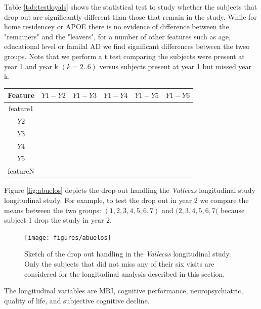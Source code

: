 \documentclass[11pt]{article}
\theoremstyle{definition}
\theoremstyle{remark}
\begin{document}
Table \ref{tab:testloyals} shows the statistical test to study whether the subjects that drop out are significantly different than those that remain in the study. While for home residencey or APOE there is no evidence of difference between the "remainers" and the "leavers", for a number of other features such as age, educational level or familal AD we find significant differences between the tweo groups. Note that we perform a t test comparing the subjects were present at year 1 and year k $(k=2..6)$ versus subjects present at year 1 but missed year k.

\begin{center}
\begin{tabular}{cccccc} \toprule
    {Feature} & {${Y1-Y2}$} & {${Y1-Y3}$} & {${Y1-Y4}$} & {${Y1-Y5}$} & {${Y1-Y6}$} \\ \midrule
    {feature1}  & & & & & \\
    {${Y2}$}  & & & & & \\ %
    {${Y3}$}  & & & & & \\  
    {${Y4}$}  & & & & & \\ 
    {${Y5}$}  & & & & & \\
    {featureN}  & & & & & \\ \bottomrule
\end{tabular}
\end{center}  



Figure \ref{fig:abuelos} depicts the drop-out handling the \emph{Vallecas} longitudinal study longitudinal study. For example, to test  the drop out in year 2 we compare the means between the two groups: $(1,2,3,4,5,6,7)$ and $(2,3,4,5,6,7($ because subject 1 drop the study in year 2.
\begin{figure}[H]
        \centering
        \texttt{[image: figures/abuelos]}
        \caption{Sketch of the drop out handling in the \emph{Vallecas} longitudinal study. Only the subjects that did not miss any of their six visits are considered for the longitudinal analysis described in this section.} 
        \label{fig:tce}
\end{figure}



The longitudinal variables are MRI, cognitive performance, neuropsychiatric, quality of life, and subjective cognitive decline.
\end{document}
